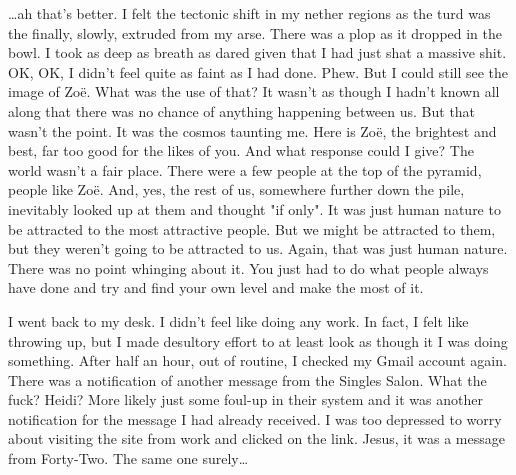 {\dots}ah that's better. I felt the tectonic shift in my nether
regions as the turd was the finally, slowly, extruded from my arse.
There was a plop as it dropped in the bowl. I took as deep as breath
as dared given that I had just shat a massive shit. OK, OK, I didn't
feel quite as faint as I had done. Phew. But I could still see the
image of Zoë. What was the use of that? It wasn't as though I
hadn't known all along that there was no chance of anything
happening between us. But that wasn't the point. It was the cosmos
taunting me. Here is Zoë, the brightest and best, far too good
for the likes of {\twelveit you}. And what response could I give?
The world wasn't a fair place. There were a few people at the top of
the pyramid, people like Zoë. And, yes, the rest of us,
somewhere further down the pile, inevitably looked up at them and
thought "if only". It was just human nature to be attracted to the
most attractive people. But we might be attracted to them, but they
weren't going to be attracted to us. Again, that was just human
nature. There was no point whinging about it. You just had to do
what people always have done and try and find your own level and
make the most of it.

I went back to my desk. I didn't feel like doing any work. In fact,
I felt like throwing up, but I made desultory effort to at least
look as though it I was doing something. After half an hour, out of
routine, I checked my Gmail account again. There was a notification
of another message from the Singles Salon. What the fuck? Heidi?
More likely just some foul-up in their system and it was another
notification for the message I had already received. I was too
depressed to worry about visiting the site from work and clicked on
the link. Jesus, it was a message from Forty-Two. The same one
surely\dots

